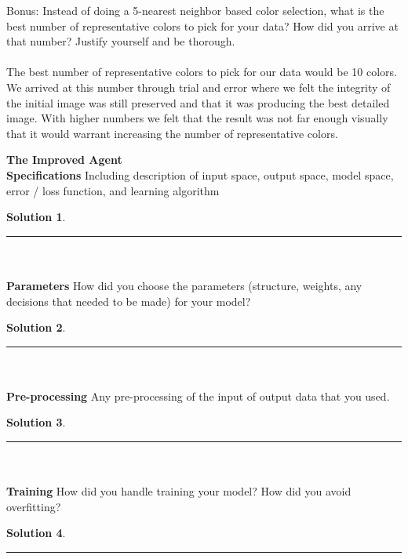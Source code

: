 \documentclass{article}
\theoremstyle{definition}
\def\fline{\rule{0.75\linewidth}{0.5pt}}
\newcommand{\finishline}{\vspace{-15pt}\begin{center}\fline\end{center}}
\newtheorem*{solution*}{Solution}
\newenvironment{solution}{\begin{solution*}}{{\finishline} \end{solution*}}
\begin{document}
 Bonus: Instead of doing a 5-nearest neighbor based color selection, what is the best number of representative colors to pick for your data? How did you arrive at that number? Justify yourself and be thorough. \\\\
 The best number of representative colors to pick for our data would be 10 colors. We arrived at this number through trial and error where we felt the integrity of the initial image was still preserved and that it was producing the best detailed image. With higher numbers we felt that the result was not far enough visually that it would warrant increasing the number of representative colors. 

\textbf{\Large The Improved Agent} \\
	\textbf{Specifications}
	    Including description of input space, output space, model space, error / loss function, and learning algorithm 
	    \begin{solution} \hfill \\
        
        \end{solution}\\\\
    
    \textbf{Parameters}
        How did you choose the parameters (structure, weights, any decisions that needed to be made) for your model? 
        \begin{solution} \hfill \\
    
        \end{solution}\\\\
        
    \textbf{Pre-processing}
        Any pre-processing of the input of output data that you used.
        \begin{solution} \hfill \\
    
        \end{solution}\\\\
        
    \textbf{Training}
        How did you handle training your model? How did you avoid overfitting? 
        \begin{solution} \hfill \\
    
        \end{solution}\\\\
        
\end{document}
